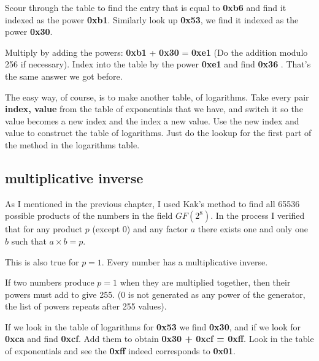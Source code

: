 \documentclass[11pt, oneside]{article}
\begin{document}
Scour through the table to find the entry that is equal to \textbf{0xb6} and find it indexed as the power \textbf{0xb1}.  Similarly look up \textbf{0x53}, we find it indexed as the power \textbf{0x30}.

Multiply by adding the powers:  \textbf{0xb1} + \textbf{0x30} = \textbf{0xe1} (Do the addition modulo 256 if necessary).  Index into the table by the power \textbf{0xe1} and find \textbf{0x36} .  That's the same answer we got before.

The easy way, of course, is to make another table, of logarithms.  Take every pair \textbf{index, value} from the table of exponentials that we have, and switch it so the value becomes a new index and the index a new value.  Use the new index and value to construct the table of logarithms. Just do the lookup for the first part of the method in the logarithms table.

\subsection*{multiplicative inverse}

As I mentioned in the previous chapter, I used Kak's method to find all 65536 possible products of the numbers in the field $GF(2^8)$.  In the process I verified that for any product $p$ (except 0) and any factor $a$ there exists one and only one $b$ such that $a \times b = p$.  

This is also true for $p = 1$.  Every number has a multiplicative inverse.

If two numbers produce $p = 1$ when they are multiplied together, then their powers must add to give 255.  (0 is not generated as any power of the generator, the list of powers repeats after 255 values).

If we look in the table of logarithms for \textbf{0x53} we find \textbf{0x30}, and if we look for \textbf{0xca} and find \textbf{0xcf}.  Add them to obtain \textbf{0x30 + 0xcf = 0xff}.  Look in the table of exponentials and see the \textbf{0xff} indeed corresponds to \textbf{0x01}.
\end{document}
